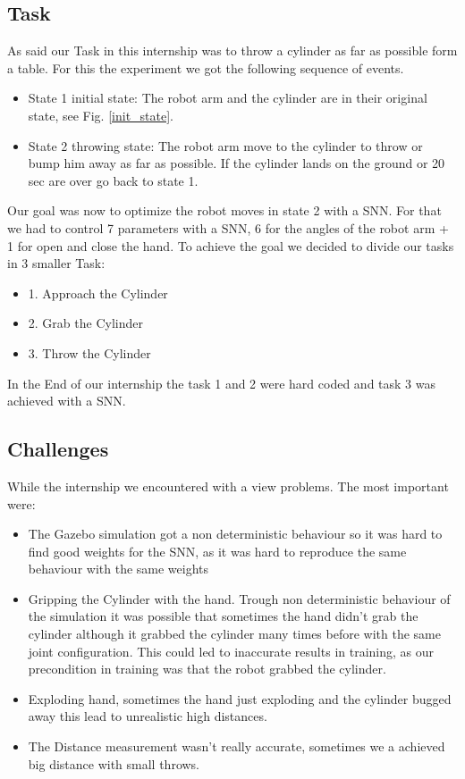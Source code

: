 \subsection{Task}
As said our Task in this internship was to throw a cylinder as far as possible form a table. For this the experiment we got the following sequence of events.
 \begin{itemize}
\item State 1 initial state: The robot arm and the cylinder are in their original state, see Fig. \ref{init_state}.
\item State 2 throwing state: The robot arm move to the cylinder to throw or bump him away as far as possible. If the cylinder lands on the ground or 20 sec are over go back to state 1.
\end{itemize}
Our goal was now to optimize the robot moves in state 2 with a SNN. For that we had to control 7 parameters with a SNN, 6 for the angles of the robot arm + 1 for open and close the hand. 
To achieve the goal we decided to divide our tasks in 3 smaller Task:
 \begin{itemize}
\item 1. Approach the Cylinder
\item 2. Grab the Cylinder
\item 3. Throw the Cylinder
\end{itemize}
In the End of our internship the task 1 and 2 were hard coded and task 3 was achieved with a SNN.
\subsection{Challenges}
\label{sec:challenges}
While the internship we encountered with a view problems. The most important were:
 \begin{itemize}
\item The Gazebo simulation got a non deterministic behaviour so it was hard to find good weights for the SNN, as it was hard to reproduce the same behaviour with the same weights
\item Gripping the Cylinder with the hand. Trough non deterministic behaviour of the simulation it was possible that sometimes the hand didn't grab the cylinder although it grabbed the cylinder many times before with the same joint configuration. This could led to inaccurate results in training, as our precondition in training was that the robot grabbed the cylinder.
\item Exploding hand, sometimes the hand just exploding and the cylinder bugged away this lead to unrealistic high distances.
\item The Distance measurement wasn't really accurate, sometimes we a achieved big distance with small throws.
\end{itemize}


